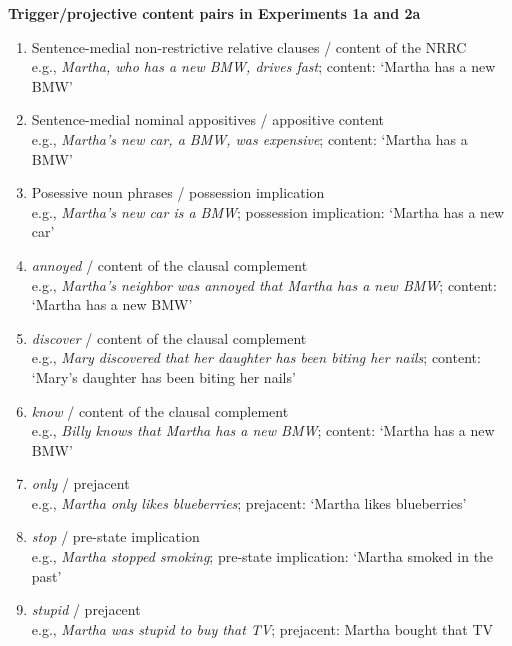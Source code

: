 \documentclass[11pt,fleqn]{article}
\newcommand{\6}{\mbox{$[\hspace*{-.6mm}[$}}
\newcommand{\9}{\mbox{$]\hspace*{-.6mm}]$}}
\begin{document}
\begin{exe}
\ex\label{pairs1a2a} {\bf Trigger/projective content pairs in Experiments 1a and 2a}

\begin{enumerate}[itemsep=-.5mm]

\item Sentence-medial non-restrictive relative clauses / content of the NRRC
\\ e.g., {\em Martha, who has a new BMW, drives fast}; content: `Martha has a new BMW'

\item Sentence-medial nominal appositives / appositive content
\\ e.g., {\em Martha's new car, a BMW, was expensive}; content: `Martha has a BMW'


\item Posessive noun phrases / possession implication
\\ e.g., {\em Martha's new car is a BMW}; possession implication: `Martha has a new car'

\item {\em annoyed} / content of the clausal complement
\\ e.g., {\em Martha's neighbor was annoyed that Martha has a new BMW}; content: `Martha has a new BMW'

\item {\em discover} / content of the clausal complement
\\ e.g., {\em Mary discovered that her daughter has been biting her nails}; content: `Mary's daughter has been biting her nails'

\item {\em know} / content of the clausal complement
\\ e.g., {\em Billy knows that Martha has a new BMW}; content: `Martha has a new BMW'

\item {\em only} / prejacent
\\ e.g., {\em Martha only likes blueberries}; prejacent: `Martha likes blueberries'

\item {\em stop} / pre-state implication
\\ e.g., {\em Martha stopped smoking}; pre-state implication: `Martha smoked in the past'

\item {\em stupid} / prejacent
\\ e.g., {\em Martha was stupid to buy that TV}; prejacent: Martha bought that TV


\end{enumerate}
\end{exe}
\end{document}
